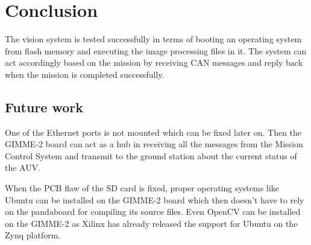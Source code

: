 \section{Conclusion}\label{sec:conclusion}
The vision system is tested successfully in terms of booting an operating system from flash memory and executing the image processing files in it. The system can act accordingly based on the mission by receiving CAN messages and reply back when the mission is completed successfully.


\subsection{Future work}
One of the Ethernet ports is not mounted which can be fixed later on. Then the GIMME-2 board can act as a hub in receiving all the messages from the Mission Control System and transmit to the ground station about the current status of the AUV. 

When the PCB flaw of the SD card is fixed, proper operating systems like Ubuntu can be installed on the GIMME-2 board \cite{web:ubuntuZynq} which then doesn't have to rely on the pandaboard for compiling its source files. Even OpenCV can be installed on the GIMME-2 as Xilinx has already released the support for Ubuntu on the Zynq platform.

